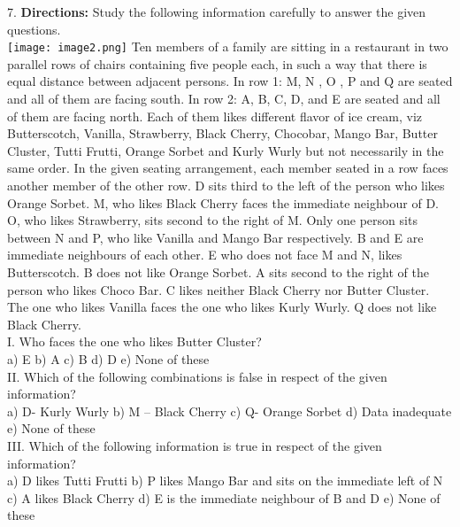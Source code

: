 \documentclass[
]{article}
\begin{document}
7. \textbf{Directions:} Study the following information carefully to answer the given questions.\\
\texttt{[image: image2.png]}
Ten members of a family are sitting in a restaurant in two parallel rows of chairs containing
five people each, in such a way that there is equal distance between adjacent persons.
In row 1: M, N , O , P and Q are seated and all of them are facing south. In row 2: A, B, C, D,
and E are seated and all of them are facing north. Each of them likes different flavor of ice
cream, viz Butterscotch, Vanilla, Strawberry, Black Cherry, Chocobar, Mango Bar, Butter
Cluster, Tutti Frutti, Orange Sorbet and Kurly Wurly but not necessarily in the same order.
In the given seating arrangement, each member seated in a row faces another member of the
other row. D sits third to the left of the person who likes Orange Sorbet. M, who likes Black
Cherry faces the immediate neighbour of D. O, who likes Strawberry, sits second to the
right of M. Only one person sits between N and P, who like Vanilla and Mango Bar
respectively. B and E are immediate neighbours of each other. E who does not face M and N,
likes Butterscotch. B does not like Orange Sorbet. A sits second to the right of the person
who likes Choco Bar. C likes neither Black Cherry nor Butter Cluster. The one who likes
Vanilla faces the one who likes Kurly Wurly. Q does not like Black Cherry.\\

I. Who faces the one who likes Butter Cluster?\\
a) E \hspace{2mm}b) A \hspace{2mm}c) B \hspace{2mm}d) D \hspace{2mm}e) None of these\\

II. Which of the following combinations is false in respect of the given information?\\
a) D- Kurly Wurly \hspace{2mm}b) M – Black Cherry \hspace{2mm}c) Q- Orange Sorbet
\hspace{2mm}d) Data inadequate \hspace{2mm}e) None of these\\

III. Which of the following information is true in respect of the given information?\\
a) D likes Tutti Frutti \hspace{2mm}b) P likes Mango Bar and sits on the immediate left of N
\hspace{2mm}c) A likes Black Cherry \hspace{2mm}d) E is the immediate neighbour of B and D
\hspace{2mm}e) None of these\\
\end{document}
